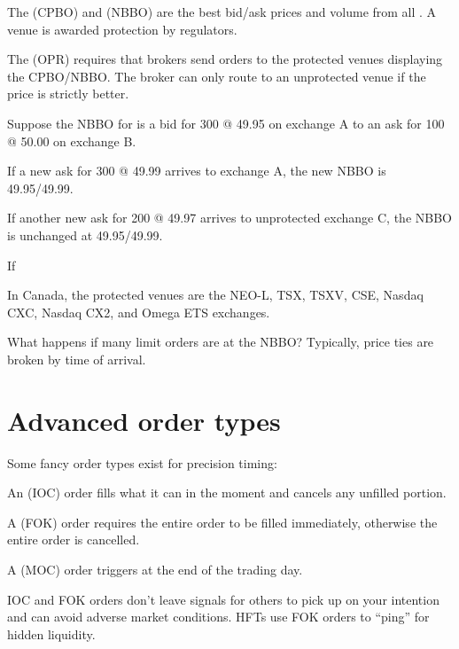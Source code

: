 \documentclass[class=bu430,notes,tikz]{agony}
\begin{document}
\begin{defn*}
  The  (CPBO) and  (NBBO)
  are the best bid/ask prices and volume from all .
  A venue is awarded protection by regulators.

  The  (OPR) requires that brokers send orders
  to the protected venues displaying the CPBO/NBBO.
  The broker can only route to an unprotected venue if the price is strictly better.
\end{defn*}

\begin{example}
  Suppose the NBBO for  is a bid for 300 @ 49.95 on exchange A
  to an ask for 100 @ 50.00 on exchange B.

  If a new ask for 300 @ 49.99 arrives to exchange A, the new NBBO is 49.95/49.99.

  If another new ask for 200 @ 49.97 arrives to unprotected exchange C,
  the NBBO is unchanged at 49.95/49.99.

  If
\end{example}

In Canada, the protected venues are the NEO-L, TSX, TSXV, CSE, Nasdaq CXC,
Nasdaq CX2, and Omega ETS exchanges.

What happens if many limit orders are at the NBBO?
Typically, price ties are broken by time of arrival.

\section{Advanced order types}

Some fancy order types exist for precision timing:
\begin{defn}
  An  (IOC) order
  fills what it can in the moment and cancels any unfilled portion.

  A  (FOK) order requires
  the entire order to be filled immediately, otherwise the entire order is cancelled.

  A  (MOC) order
  triggers at the end of the trading day.
\end{defn}
IOC and FOK orders don't leave signals for others to pick up on your intention
and can avoid adverse market conditions.
HFTs use FOK orders to ``ping'' for hidden liquidity.
\end{document}
